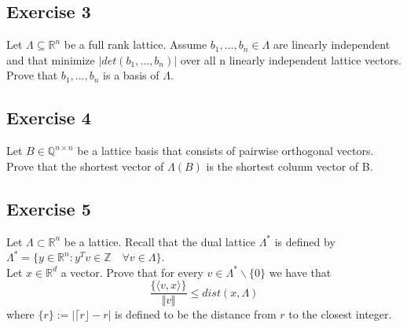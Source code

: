 \documentclass{article}
\def\RR{\mathbb{R}}
\begin{document}
\subsection*{Exercise 3}
Let $\Lambda \subseteq \RR^n$ be a full rank lattice. Assume $b_1,... ,b_n \in \Lambda$ are linearly independent and that minimize
$|det(b_1,... ,b_n)|$ over all n linearly independent lattice vectors. Prove that $b_1,... ,b_n$ is a basis of $\Lambda$.

\subsection*{Exercise 4}
Let $B \in \mathbb{Q}^{n\times n}$ be a lattice basis that consists of pairwise orthogonal vectors. Prove that the shortest vector of $\Lambda(B)$ is the shortest column vector of B.

\subsection*{Exercise 5}
Let $\Lambda \subset \RR^n$ be a lattice. Recall that the dual lattice $\Lambda^\ast$ is defined by $\Lambda^\ast = \{ y \in \mathbb{R}^n : y^Tv \in \mathbb{Z} \quad \forall v \in \Lambda\}$. \\
Let $x \in \RR^d$ a vector. Prove that for every $v \in \Lambda^\ast \backslash \{0\}$ we have that  
$$\frac{\{\langle v, x \rangle \}}{\Vert v \Vert} \leq dist(x, \Lambda)$$
where $\{r\} := |\lceil r \rfloor - r|$ is defined to be the distance from $r$ to the closest integer.



    
\end{document}
